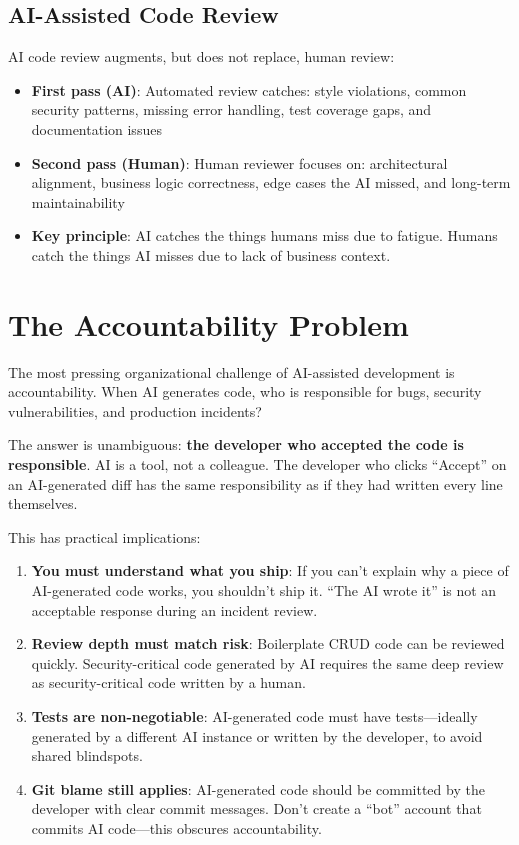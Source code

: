 \subsection{AI-Assisted Code Review}

AI code review augments, but does not replace, human review:

\begin{itemize}[leftmargin=*]
    \item \textbf{First pass (AI)}: Automated review catches: style violations, common security patterns, missing error handling, test coverage gaps, and documentation issues
    \item \textbf{Second pass (Human)}: Human reviewer focuses on: architectural alignment, business logic correctness, edge cases the AI missed, and long-term maintainability
    \item \textbf{Key principle}: AI catches the things humans miss due to fatigue. Humans catch the things AI misses due to lack of business context.
\end{itemize}


\section{The Accountability Problem}

The most pressing organizational challenge of AI-assisted development is accountability. When AI generates code, who is responsible for bugs, security vulnerabilities, and production incidents?

The answer is unambiguous: \textbf{the developer who accepted the code is responsible}. AI is a tool, not a colleague. The developer who clicks ``Accept'' on an AI-generated diff has the same responsibility as if they had written every line themselves.

This has practical implications:

\begin{enumerate}[leftmargin=*]
    \item \textbf{You must understand what you ship}: If you can't explain why a piece of AI-generated code works, you shouldn't ship it. ``The AI wrote it'' is not an acceptable response during an incident review.
    \item \textbf{Review depth must match risk}: Boilerplate CRUD code can be reviewed quickly. Security-critical code generated by AI requires the same deep review as security-critical code written by a human.
    \item \textbf{Tests are non-negotiable}: AI-generated code must have tests---ideally generated by a different AI instance or written by the developer, to avoid shared blindspots.
    \item \textbf{Git blame still applies}: AI-generated code should be committed by the developer with clear commit messages. Don't create a ``bot'' account that commits AI code---this obscures accountability.
\end{enumerate}

